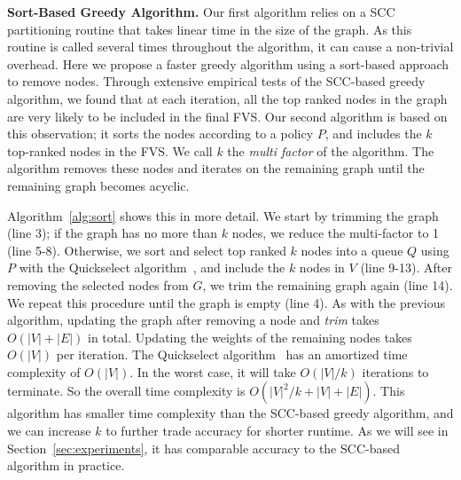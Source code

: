 {\bf Sort-Based Greedy Algorithm.} Our first algorithm relies on a SCC partitioning routine that takes linear time in the size of the graph. As this routine is called several times throughout the algorithm, it can cause a non-trivial overhead. Here we propose a faster greedy algorithm using a sort-based approach to remove nodes. Through extensive empirical tests of the SCC-based greedy algorithm, we found that at each iteration, all the top ranked nodes in the graph are very likely to be included in the final FVS. Our second algorithm is based on this observation; it sorts the nodes according to a policy $P$, and includes the $k$ top-ranked nodes in the FVS. We call $k$ the \emph{multi factor} of the algorithm. The algorithm removes these nodes and iterates on the remaining graph until the remaining graph becomes acyclic.

Algorithm~\ref{alg:sort} shows this in more detail. We start by trimming the graph (line 3); if the graph has no more than $k$ nodes, we reduce the multi-factor to 1 (line 5-8). Otherwise, we sort and select top ranked $k$ nodes into a queue $Q$ using $P$ with the Quickselect algorithm~\cite{hoare61cacm}, and include the $k$ nodes in $V$ (line 9-13).
After removing the selected nodes from $G$, we trim the remaining graph
again (line 14). We repeat this procedure until the graph is empty (line 4). 
As with the previous algorithm, updating the graph after removing a node and \emph{trim} takes $O(|V|+|E|)$ in total. Updating the weights of the remaining nodes takes $O(|V|)$ per iteration. The
Quickselect algorithm~\cite{hoare61cacm} has an amortized time complexity of
$O(|V|)$. In the worst case, it will take $O(|V|/k)$ iterations to terminate. So
the overall time complexity is $O(|V|^2/k + |V| + |E|)$.
This algorithm has smaller time complexity than the SCC-based greedy algorithm, and we can increase $k$ to further trade accuracy for shorter runtime. As we will see in Section~\ref{sec:experiments}, it has comparable accuracy to the SCC-based algorithm in practice.

